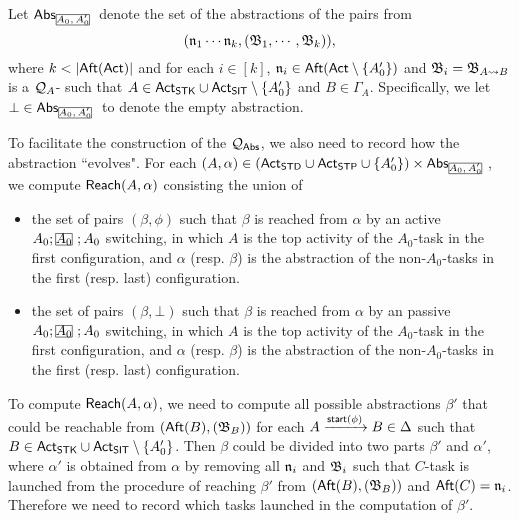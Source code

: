 {Let $\abs_{\mhcancel{A_0,A_0'}}$ denote the set of the abstractions of the pairs from $$(\mathfrak{n}_1\cdots\mathfrak{n}_k,({\mathfrak{B} }_1,\cdots,{\mathfrak{B} }_k)),$$ where $k<|\aft(\act)|$ and for each $i\in[k]$, $\mathfrak{n}_i\in{\sf Aft}({\sf Act}\setminus\{A_0'\})$ and ${\mathfrak{B} }_i = {\mathfrak{B} }_{A\rightsquigarrow B}$ is a ${\mathcal{Q} }_{A}$-{\WOTrNFA} such that $A\in{\sf Act}_{\mathsf{STK}}\cup{\sf Act}_{\mathsf{SIT}}\setminus\{A_0'\}$ and $B\in\Gamma_A$. Specifically, we let $\bot\in\abs_{\mhcancel{A_0,A_0'}}$ to denote the empty abstraction.

To facilitate the construction of the {\WOTrPDS} ${\mathcal{Q} }_{{\mathsf{Abs} }}$, we also need to record how the abstraction ``evolves". For each $(A, \alpha) \in (\act_{\standard}\cup\act_{\singletop}\cup\{A_0'\}) \times \abs_{\mhcancel{A_0,A_0'}}$, 
we compute ${\sf Reach}(A, \alpha)$ consisting the union of 
\begin{itemize}
    \item the set of pairs $(\beta,\phi)$ such that $\beta$ is reached from $\alpha$ by an active $A_0; \mhcancel{A_0}; A_0$ switching, in which $A$ is the top activity of the $A_0$-task in the first configuration, 
    and $\alpha$ (resp. $\beta$) is the abstraction of the non-$A_0$-tasks in the first (resp. last) configuration.
    \item the set of pairs $(\beta,\bot)$ such that $\beta$ is reached from $\alpha$ by an passive $A_0; \mhcancel{A_0}; A_0$ switching, in which $A$ is the top activity of the $A_0$-task in the first configuration,
    and $\alpha$ (resp. $\beta$) is the abstraction of the non-$A_0$-tasks in the first (resp. last) configuration.
\end{itemize}

To compute ${\sf Reach}(A,\alpha)$, we need to compute all possible abstractions $\beta'$ that could be reachable from $({\sf Aft}(B),({\mathfrak{B} }_{B}))$ for each $A\xrightarrow{{\mathsf{start} }(\phi)}B\in\Delta$ such that $B\in{\sf Act}_{\mathsf{STK}}\cup{\sf Act}_{\mathsf{SIT}}\setminus\{A_0'\}$. Then $\beta$ could be divided into two parts $\beta'$ and $\alpha'$, where $\alpha'$ is obtained from $\alpha$ by removing all $\mathfrak{n}_i$ and ${\mathfrak{B} }_i$ such that $C$-task is launched from the procedure of reaching $\beta'$ from $({\sf Aft}(B),({\mathfrak{B} }_{B}))$ and ${\sf Aft}(C) = \mathfrak{n}_i$. Therefore we need to record which tasks launched in the computation of $\beta'$.

}
